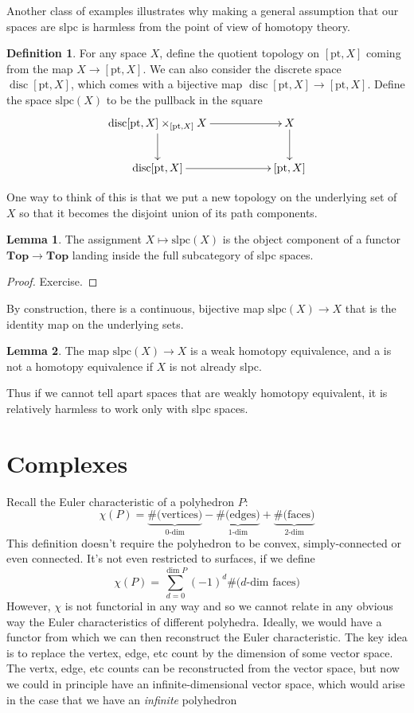 \documentclass{tufte-handout}
\def\pt {\mathrm{pt}}
\def\Top {\mathbf{Top}}
\DeclareMathOperator{\disc}{disc}
\theoremstyle{definition}
\newtheorem{lemma}{Lemma}
\newtheorem{definition}{Definition}
\begin{document}
Another class of examples illustrates why making a general assumption that our spaces are slpc is harmless from the point of view of homotopy theory.

\begin{definition}
For any space $X$, define the quotient topology on $[\pt,X]$ coming from the map $X\to [\pt,X]$. We can also consider the discrete space $\disc[\pt,X]$, which comes with a bijective map $\disc[\pt,X] \to [\pt,X]$. Define the space $\mathrm{slpc}(X)$ to be the pullback in the square
\[
	\xymatrix{
		\disc[\pt,X] \times_{[\pt,X]} X \ar[rr] \ar[d] && X \ar[d]\\
		\disc[\pt,X] \ar[rr] && [\pt,X]
	}
\]
\end{definition}

One way to think of this is that we put a new topology on the underlying set of $X$ so that it becomes the disjoint union of its path components.

\begin{lemma}
The assignment $X\mapsto \mathrm{slpc}(X)$ is the object component of a functor $\Top \to \Top$ landing inside the full subcategory of slpc spaces.
\end{lemma}

\begin{proof}
Exercise.
\end{proof}

By construction, there is a continuous, bijective map $\mathrm{slpc}(X) \to X$ that is the identity map on the underlying sets.

\begin{lemma}
The map $\mathrm{slpc}(X) \to X$ is a weak homotopy equivalence, and a is not a homotopy equivalence if $X$ is not already slpc.
\end{lemma}

Thus if we cannot tell apart spaces that are weakly homotopy equivalent, it is relatively harmless to work only with slpc spaces.

\section{Complexes}

Recall the Euler characteristic of a polyhedron $P$:
\[
	\chi(P) = \underbrace{\text{\#(vertices)}}_{0\text{-dim}} - \underbrace{\text{\#(edges)}}_{1\text{-dim}} + \underbrace{\text{\#(faces)}}_{2\text{-dim}}
\]
This definition doesn't require the polyhedron to be convex, simply-connected or even connected. It's not even restricted to surfaces, if we define
\[
	\chi(P) = \sum_{d=0}^{\dim P} (-1)^d \text{\#($d$-dim faces)}
\]
However, $\chi$ is not functorial in any way and so we cannot relate in any obvious way the Euler characteristics of different polyhedra. Ideally, we would have a functor from which we can then reconstruct the Euler characteristic. The key idea is to replace the vertex, edge, etc count by the dimension of some vector space. The vertx, edge, etc counts can be reconstructed from the vector space, but now we could in principle have an infinite-dimensional vector space, which would arise in the case that we have an \emph{infinite} polyhedron
\end{document}
